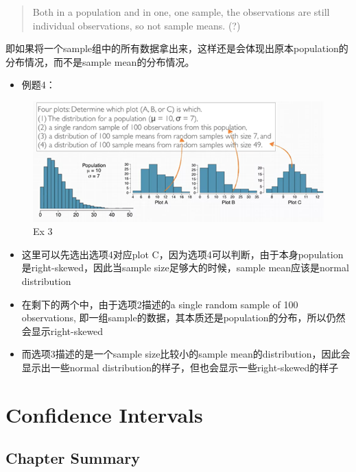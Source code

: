\documentclass[]{book}
\providecommand{\tightlist}{%
  \setlength{\itemsep}{0pt}\setlength{\parskip}{0pt}}
\begin{document}
\begin{quote}
Both in a population and in one, one sample, the observations are still
individual observations, so not sample means. (?)
\end{quote}

即如果将一个sample组中的所有数据拿出来，这样还是会体现出原本population的分布情况，而不是sample
mean的分布情况。

\begin{itemize}
\tightlist
\item
  例题4：
\end{itemize}

\begin{figure}

{\centering \includegraphics[width=0.8\linewidth]{graphs/1-10} 

}

\caption{Ex 3}\label{fig:fig10}
\end{figure}

\begin{itemize}
\tightlist
\item
  这里可以先选出选项4对应plot
  C，因为选项4可以判断，由于本身population是right-skewed，因此当sample
  size足够大的时候，sample mean应该是normal distribution
\item
  在剩下的两个中，由于选项2描述的a single random sample of 100
  observations,
  即一组sample的数据，其本质还是population的分布，所以仍然会显示right-skewed
\item
  而选项3描述的是一个sample size比较小的sample
  mean的distribution，因此会显示出一些normal
  distribution的样子，但也会显示一些right-skewed的样子
\end{itemize}

\chapter{Confidence Intervals}\label{conf-int}

\section{Chapter Summary}\label{chapter-summary}
\end{document}
